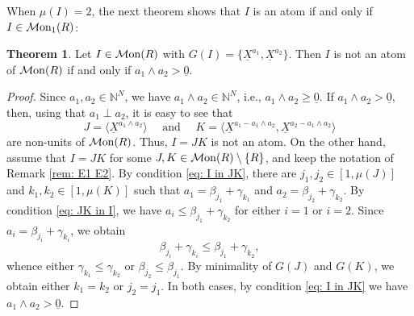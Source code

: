 \documentclass[a4paper,10pt,reqno]{amsart}
\theoremstyle{definition}
\newtheorem{theorem}{Theorem}[section]
\theoremstyle{definition}
\providecommand\Mon{{\mathcal{M}{\rm on}}}
\begin{document}
\bigskip


When $\mu(I)=2$, the next theorem shows that $I$ is an atom if and only if $I\in \Mon_1(R)$:

\begin{theorem}\label{thm: 2-gen}
    Let $I\in \Mon(R)$ with $G(I) = \{\underline X^{a_1},\underline X^{a_{2}}\}$. Then $I$ is not an atom of $\Mon(R)$ if and only if $a_1\wedge a_2>\underline 0$.
\end{theorem}
\begin{proof}
    Since $a_1,a_2\in\mathbb N^N$, we have $a_1\wedge a_2\in\mathbb N^N$, i.e., $a_1\wedge a_2\ge \underline 0$. If $a_1\wedge a_2 > \underline 0$, then, using that $a_1\perp a_2$, it is easy to see that
   \[J=\langle \underline X^{a_1\wedge a_2}\rangle \quad \text{ and }\quad K=\langle \underline X^{a_1-a_1\wedge a_2}, \underline X^{a_2-a_1\wedge a_2} \rangle \]
   are non-units of $\Mon(R)$. Thus, $I=JK$ is not an atom.
    On the other hand, assume that $I=JK$ for some $J,K\in\Mon(R)\setminus\{R\}$, and keep the notation of Remark \ref{rem: E1 E2}. By condition \ref{eq: I in JK}, there are $j_1,j_2\in [1,\mu(J)]$ and $k_1,k_2\in [1,\mu(K)]$ such that $a_1 = \beta_{j_1}+\gamma_{k_1}$ and $a_2=\beta_{j_2}+\gamma_{k_2}$. By condition \ref{eq: JK in I}, we have $a_i\le \beta_{j_1}+\gamma_{k_2}$ for either $i=1$ or $i=2$. Since $a_i=\beta_{j_i}+\gamma_{k_i}$, we obtain
    \[ \beta_{j_i}+\gamma_{k_i} \le \beta_{j_1}+\gamma_{k_2}, \]
    whence either $\gamma_{k_1}\le \gamma_{k_2}$ or $\beta_{j_2}\le \beta_{j_1}$. By minimality of $G(J)$ and $G(K)$, we obtain either $k_1=k_2$ or $j_2=j_1$. In both cases, by condition \ref{eq: I in JK} we have $a_1\wedge a_2>\underline 0$.
\end{proof}
\end{document}
